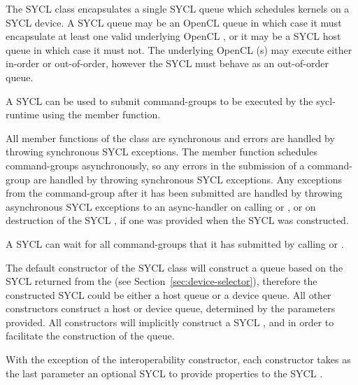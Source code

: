 

The SYCL  class encapsulates a single SYCL queue which
schedules kernels on a SYCL device. A SYCL queue may be an OpenCL queue in
which case it must encapsulate at least one valid underlying OpenCL
, or it may be a SYCL host queue in which case it
must not. The underlying OpenCL (s) may execute 
either in-order or out-of-order, however the SYCL 
must behave as an out-of-order queue.

A SYCL  can be used to submit \glspl{command-group} to be
executed by the \gls{sycl-runtime} using the  member
function.

All member functions of the  class are synchronous and errors
are handled by throwing synchronous SYCL exceptions. The 
member function schedules \glspl{command-group} asynchronously, so any errors
in the submission of a \gls{command-group} are handled by throwing synchronous
SYCL exceptions. Any exceptions from the \gls{command-group} after it has
been submitted are handled by throwing asynchronous SYCL exceptions to an
\gls{async-handler} on calling  or , or on destruction of the SYCL , if one was
provided when the SYCL  was constructed.

A SYCL  can wait for all \glspl{command-group} that it has
submitted by calling  or .

The default constructor of the SYCL  class will construct a
queue based on the SYCL  returned from the  (see Section~\ref{sec:device-selector}), therefore
the constructed SYCL  could be either a host queue or a device
queue. All other constructors construct a host or device queue, determined by the
parameters provided. All constructors will implicitly construct a SYCL
,  and  in order to
facilitate the construction of the queue.

With the exception of the interoperability constructor, each constructor takes as the last
parameter an optional SYCL  to provide properties to
the SYCL .


